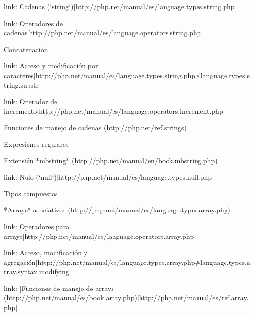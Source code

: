 \begin{longenum}
\begin{longenum}
\begin{longenum}
\begin{longenum}
\begin{longenum}
                \end{longenum}
            \end{longenum}
            \item [link: Cadenas (`string`)|http://php.net/manual/es/language.types.string.php]
            \begin{longenum}
                \item [link: Operadores de cadenas|http://php.net/manual/es/language.operators.string.php]
                \begin{longenum}
                    \item Concatenación
                    \item [link: Acceso y modificación por caracteres|http://php.net/manual/es/language.types.string.php#language.types.string.substr]
                    \item [link: Operador de incremento|http://php.net/manual/es/language.operators.increment.php]
                \end{longenum}
                \item [Funciones de manejo de cadenas](http://php.net/ref.strings)
                \item Expresiones regulares
                \item [Extensión *mbstring*](http://php.net/manual/en/book.mbstring.php)
            \end{longenum}
            \item [link: Nulo (`null`)|http://php.net/manual/es/language.types.null.php]
        \end{longenum}
        \item Tipos compuestos
        \begin{longenum}
            \item [*Arrays* asociativos](http://php.net/manual/es/language.types.array.php)
            \begin{longenum}
                \item [link: Operadores para arrays|http://php.net/manual/es/language.operators.array.php]
                \begin{longenum}
                    \item [link: Acceso, modificación y agregación|http://php.net/manual/es/language.types.array.php#language.types.array.syntax.modifying]
                \end{longenum}
                \item [link: [Funciones de manejo de arrays](http://php.net/manual/es/book.array.php)|http://php.net/manual/es/ref.array.php]

\end{longenum}
\end{longenum}
\end{longenum}
\end{longenum}
